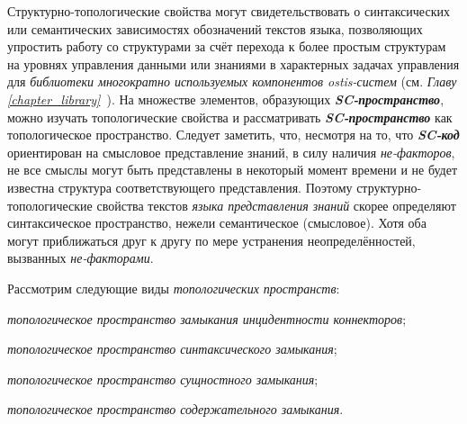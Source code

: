 Структурно-топологические свойства могут свидетельствовать о синтаксических или семантических зависимостях обозначений текстов языка, позволяющих упростить работу со структурами за счёт перехода к более простым структурам на уровнях управления данными или знаниями в характерных задачах управления для \textit{библиотеки многократно используемых компонентов ostis-систем} (см. \textit{Главу \ref{chapter_library}~}).
На множестве элементов, образующих \textbf{\textit{SC-пространство}}, можно изучать топологические свойства и рассматривать \textbf{\textit{SC-пространство}} как топологическое пространство. Следует заметить, что, несмотря на то, что \textbf{\textit{SC-код}} ориентирован на смысловое представление знаний, в силу наличия \textit{не-факторов}, не все смыслы могут быть представлены в некоторый момент времени и не будет известна структура соответствующего представления. Поэтому структурно-топологические свойства текстов \textit{языка представления знаний} скорее определяют синтаксическое пространство, нежели семантическое (смысловое). Хотя оба могут приближаться друг к другу по мере устранения неопределённостей, вызванных \textit{не-факторами}.

Рассмотрим следующие виды \textit{топологических пространств}:
\begin{textitemize}
	\item \textit{топологическое пространство замыкания инцидентности коннекторов};
	\item \textit{топологическое пространство синтаксического замыкания};
	\item \textit{топологическое пространство сущностного замыкания};
	\item \textit{топологическое пространство содержательного замыкания}.
\end{textitemize}

\begin{SCn}
\end{SCn}

